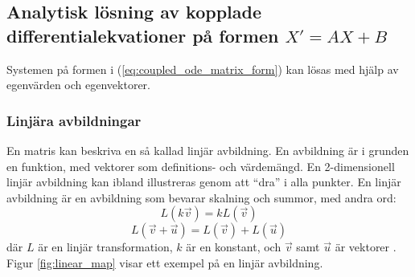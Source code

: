 \subsection{Analytisk lösning av kopplade differentialekvationer på formen \texorpdfstring{\(X'=AX+B\)}{X'=AX+B}}
Systemen på formen i (\ref{eq:coupled_ode_matrix_form}) kan lösas med hjälp av egenvärden och egenvektorer.

\subsubsection{Linjära avbildningar}
En matris kan beskriva en så kallad linjär avbildning. En avbildning är i grunden en funktion, med vektorer som definitions- och värdemängd. En 2-dimensionell linjär avbildning kan ibland illustreras genom att ``dra'' i alla punkter. En linjär avbildning är en avbildning som bevarar skalning och summor, med andra ord:
\begin{equation}
    L(k\vec{v})=kL(\vec{v})
\end{equation}
\begin{equation}
    L(\vec{v}+\vec{u})=L(\vec{v})+L(\vec{u})
\end{equation}
där \(L\) är en linjär transformation, \(k\) är en konstant, och \(\vec{v}\) samt \(\vec{u}\) är vektorer \parencite{sanderson_linear_2016}. Figur \ref{fig:linear_map} visar ett exempel på en linjär avbildning.

